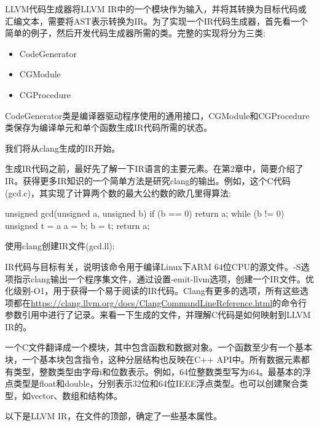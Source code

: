 
LLVM代码生成器将LLVM IR中的一个模块作为输入，并将其转换为目标代码或汇编文本，需要将AST表示转换为IR。为了实现一个IR代码生成器，首先看一个简单的例子，然后开发代码生成器所需的类。完整的实现将分为三类:

\begin{itemize}
\item
CodeGenerator

\item
CGModule

\item
CGProcedure
\end{itemize}

CodeGenerator类是编译器驱动程序使用的通用接口，CGModule和CGProcedure类保存为编译单元和单个函数生成IR代码所需的状态。

我们将从clang生成的IR开始。


生成IR代码之前，最好先了解一下IR语言的主要元素。在第2章中，简要介绍了IR。获得更多IR知识的一个简单方法是研究clang的输出。例如，这个C代码(gcd.c)，其实现了计算两个数的最大公约数的欧几里得算法:

\begin{cpp}
unsigned gcd(unsigned a, unsigned b) {
    if (b == 0)
    return a;
    while (b != 0) {
        unsigned t = a %
        a = b;
        b = t;
    }
    return a;
}
\end{cpp}

使用clang创建IR文件(gcd.ll):


IR代码与目标有关，说明该命令用于编译Linux下ARM 64位CPU的源文件。-S选项指示clang输出一个程序集文件，通过设置-emit-llvm选项，创建一个IR文件。优化级别-O1，用于获得一个易于阅读的IR代码。Clang有更多的选项，所有这些选项都在\url{https://clang.llvm.org/docs/ClangCommandLineReference.html}的命令行参数引用中进行了记录。来看一下生成的文件，并理解C代码是如何映射到LLVM IR的。

一个C文件翻译成一个模块，其中包含函数和数据对象。一个函数至少有一个基本块，一个基本块包含指令，这种分层结构也反映在C++ API中。所有数据元素都有类型，整数类型由字母i和位数表示。例如，64位整数类型写为i64。最基本的浮点类型是float和double，分别表示32位和64位IEEE浮点类型。也可以创建聚合类型，如vector、数组和结构体。

以下是LLVM IR，在文件的顶部，确定了一些基本属性。

